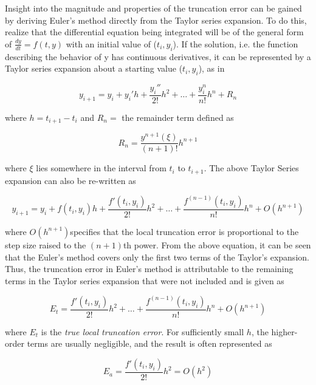\documentclass[book.tex]{subfiles}
\begin{document}
Insight into the magnitude and properties of the truncation error can be gained by deriving
Euler’s method directly from the Taylor series expansion. To do this, realize that the
differential equation being integrated will be of the general form of $\frac{dy}{dt} = f(t,y)$ with an initial value of ($t_i,y_i$). If the solution, i.e. the function describing the behavior of y has continuous derivatives, it can be represented by a Taylor series expansion about a starting value ($t_i ,y_i$), as in

\begin{equation*}
y_{i+1} = y_{i} + y_{i}'h + \frac{y_i''}{2!}h^2 + \dots + \frac{y_i^{n}}{n!}h^n + R_n
\end{equation*}

where $h = t_{i+1} - t_{i}$ and $R_n = $ the remainder term defined as

\begin{equation*}
R_n = \frac{y^{n+1}(\xi)}{(n+1)!}h^{n+1}
\end{equation*}

where $\xi$ lies somewhere in the interval from $t_i$ to $t_{i+1}$. The above Taylor Series expansion can also be re-written as

\begin{equation*}
y_{i+1} = y_{i} + f(t_i,y_i)h + \frac{f'(t_i,y_i)}{2!}h^2 + \dots + \frac{f^{(n-1)}(t_i,y_i)}{n!}h^n + O(h^{n+1})
\end{equation*}

where $O(h^{n+1})$specifies that the local truncation error is proportional to the step size raised to the $(n + 1)$th power. From the above equation, it can be seen that the Euler's method covers only the first two terms of the Taylor's expansion. Thus, the truncation error in Euler’s method is attributable to the remaining terms in the Taylor series expansion that were not included and is given as

\begin{equation*}
E_t = \frac{f'(t_i,y_i)}{2!}h^2 + \dots + \frac{f^{(n-1)}(t_i,y_i)}{n!}h^n + O(h^{n+1})
\end{equation*}

where $E_t$ is the \textit{true local truncation error}. For sufficiently small $h$, the higher-order terms are usually negligible, and the result is often represented as 

\begin{equation*}
E_a = \frac{f'(t_i,y_i)}{2!}h^2 = O(h^2)
\end{equation*}
\end{document}
